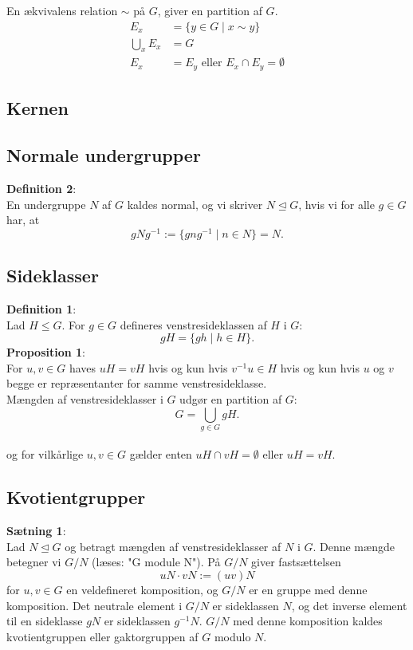 \documentclass[11pt]{article}
\begin{document}
En ækvivalens relation $\sim$ på $G$, giver en partition af $G$.\\
\begin{align*}
  E_x &= \{ y \in G \mid x \sim y\}\\
  \bigcup_x{E_x} &= G\\
  E_x &= E_y \text{ eller } E_x \cap E_y = \emptyset
\end{align*}

\subsection*{Kernen}

\subsection*{Normale undergrupper}
\textbf{Definition 2}:\\
En undergruppe $N$ af $G$ kaldes normal, og vi skriver $N \trianglelefteq G$, hvis vi for alle $g \in G$ har, at\\
$$gNg^{-1} := \{ gng^{-1} \mid n \in N \} = N.$$
\subsection*{Sideklasser}
\textbf{Definition 1}:\\
Lad $H \leq G$. For $g \in G$ defineres venstresideklassen af $H$ i $G$:\\
$$gH = \{ gh \mid h \in H \}.$$
\textbf{Proposition 1}:\\
For $u, v \in G$ haves $uH = vH$ hvis og kun hvis $v^{-1} u \in H$ hvis og kun hvis $u$ og $v$ begge er repræsentanter for samme venstresideklasse.\\
Mængden af venstresideklasser i $G$ udgør en partition af $G$:\\
$$G = \bigcup_{g \in G} gH.$$\\
og for vilkårlige $u, v \in G$ gælder enten $uH \cap vH = \emptyset$ eller $uH = vH$.
\subsection*{Kvotientgrupper}
\textbf{Sætning 1}:\\
Lad $N \trianglelefteq G$ og betragt mængden af venstresideklasser af $N$ i $G$. Denne mængde betegner vi $G / N$ (læses: "G module N"). På $G / N$ giver fastsættelsen
$$uN \cdot vN := (uv)N$$
for $u, v \in G$ en veldefineret komposition, og $G / N$ er en gruppe med denne komposition. Det neutrale element i $G / N$ er sideklassen $N$, og det inverse element til en sideklasse $gN$ er sideklassen $g^{-1} N$. $G / N$ med denne komposition kaldes kvotientgruppen eller gaktorgruppen af $G$ modulo $N$.\\
\end{document}
